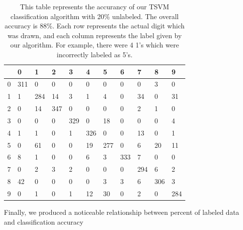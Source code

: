 \documentclass[11pt]{article}
\begin{document}
\begin{table}[]
  \centering
  \caption{This table represents the accurancy of our TSVM classification algorithm with 20\% unlabeled. The overall accuracy is 88\%. Each row represents the actual digit which was drawn, and each column represents the label given by our algorithm. For example, there were 4 1's which were incorrectly labeled as 5's.}
  \label{my-table}
  \vspace{.3in}
  \begin{tabular}{l|llllllllll}
    & 0 & 1 & 2 & 3 & 4 & 5 & 6 & 7 & 8 & 9\\\hline
    0 &311 & 0   & 0   & 0   & 0   & 0   & 0   & 0   & 3   & 0   \\
    1 &1   & 284 & 14  & 3   & 1   & 4   & 0   & 34  & 0   & 31  \\
    2 & 0   & 14  & 347 & 0   & 0   & 0   & 0   & 2   & 1   & 0   \\
    3 & 0   & 0   & 0   & 329 & 0   & 18  & 0   & 0   & 0   & 4   \\
    4 & 1   & 1   & 0   & 1   & 326 & 0   & 0   & 13  & 0   & 1   \\
    5 & 0   & 61  & 0   & 0   & 19  & 277 & 0   & 6   & 20  & 11  \\
    6 & 8   & 1   & 0   & 0   & 6   & 3   & 333 & 7   & 0   & 0   \\
    7 & 0   & 2   & 3   & 2   & 0   & 0   & 0   & 294 & 6   & 2   \\
    8 & 42  & 0   & 0   & 0   & 0   & 3   & 3   & 6   & 306 & 3   \\
    9 & 0   & 1   & 0   & 1   & 12  & 30  & 0   & 2   & 0   & 284
  \end{tabular}
  \end{table}

Finally, we produced a noticeable relationship between percent of labeled data and classification accuracy \par
\end{document}
